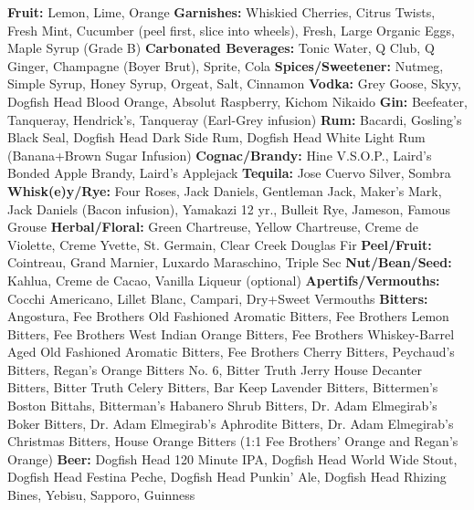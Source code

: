 \documentclass{article}
\makeatletter
\newcommand\customfont[1]{{\usefont{T1}{custom}{m}{n} #1 }} %
\newcommand \Dotfill {\leavevmode \cleaders \hb@xt@ .25em{\hss .\hss }\hfill \kern \z@}%
\makeatother
\begin{document}
{\begin{spacing}{.1}\scriptsize\raggedright\textbf{Fruit:} Lemon, Lime, Orange \textbf{Garnishes:} Whiskied Cherries, Citrus Twists, Fresh Mint, Cucumber (peel first, slice into wheels), Fresh, Large Organic Eggs, Maple Syrup (Grade B) \textbf{Carbonated Beverages:} Tonic Water, Q Club, Q Ginger, Champagne (Boyer Brut), Sprite, Cola \textbf{Spices/Sweetener:} Nutmeg, Simple Syrup, Honey Syrup, Orgeat, Salt, Cinnamon \textbf{Vodka:} Grey Goose, Skyy, Dogfish Head Blood Orange, Absolut Raspberry, Kichom Nikaido \textbf{Gin:} Beefeater, Tanqueray, Hendrick's, Tanqueray (Earl-Grey infusion) \textbf{Rum:} Bacardi, Gosling's Black Seal, Dogfish Head Dark Side Rum, Dogfish Head White Light Rum (Banana+Brown Sugar Infusion)  \textbf{Cognac/Brandy:} Hine V.S.O.P., Laird's Bonded Apple Brandy, Laird's Applejack \textbf{Tequila:} Jose Cuervo Silver, Sombra \textbf{Whisk(e)y/Rye:} Four Roses, Jack Daniels, Gentleman Jack, Maker's Mark, Jack Daniels (Bacon infusion), Yamakazi 12 yr., Bulleit Rye, Jameson, Famous Grouse \textbf{Herbal/Floral:} Green Chartreuse, Yellow Chartreuse, Creme de Violette, Creme Yvette, St. Germain, Clear Creek Douglas Fir \textbf{Peel/Fruit:} Cointreau, Grand Marnier, Luxardo Maraschino, Triple Sec \textbf{Nut/Bean/Seed:} Kahlua, Creme de Cacao, Vanilla Liqueur (optional) \textbf{Apertifs/Vermouths:} Cocchi Americano, Lillet Blanc, Campari, Dry+Sweet Vermouths \textbf{Bitters:} Angostura, Fee Brothers Old Fashioned Aromatic Bitters, Fee Brothers Lemon Bitters, Fee Brothers West Indian Orange Bitters, Fee Brothers Whiskey-Barrel Aged Old Fashioned Aromatic Bitters, Fee Brothers Cherry Bitters, Peychaud's Bitters, Regan's Orange Bitters No. 6, Bitter Truth Jerry House Decanter Bitters, Bitter Truth Celery Bitters, Bar Keep Lavender Bitters, Bittermen's Boston Bittahs, Bitterman's Habanero Shrub Bitters, Dr. Adam Elmegirab's Boker Bitters, Dr. Adam Elmegirab's Aphrodite Bitters, Dr. Adam Elmegirab's Christmas Bitters, House Orange Bitters (1:1 Fee Brothers' Orange and Regan's Orange) \textbf{Beer:} Dogfish Head 120 Minute IPA, Dogfish Head World Wide Stout, Dogfish Head Festina Peche, Dogfish Head Punkin' Ale, Dogfish Head Rhizing Bines, Yebisu, Sapporo, Guinness\\\hfill\end{spacing}}
\customfont{\makebox[1.007\columnwidth]{\hspace{-.5in}\Huge\Dotfill}}
\end{document}
